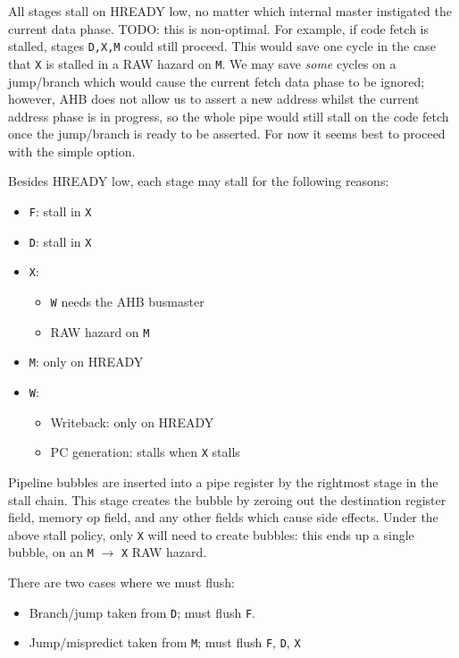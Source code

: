 \documentclass{article}
\begin{document}
All stages stall on HREADY low, no matter which internal master instigated the current data phase. TODO: this is non-optimal. For example, if code fetch is stalled, stages \texttt{D,X,M} could still proceed. This would save one cycle in the case that \texttt{X} is stalled in a RAW hazard on \texttt{M}. We may save \textit{some} cycles on a jump/branch which would cause the current fetch data phase to be ignored; however, AHB does not allow us to assert a new address whilst the current address phase is in progress, so the whole pipe would still stall on the code fetch once the jump/branch is ready to be asserted. For now it seems best to proceed with the simple option.

Besides HREADY low, each stage may stall for the following reasons:

\begin{itemize}
	\item \texttt{F}: stall in \texttt{X}
	\item \texttt{D}: stall in \texttt{X}
	\item \texttt{X}:
	\begin{itemize}
		\item \texttt{W} needs the AHB busmaster
		\item RAW hazard on \texttt{M}
	\end{itemize}
	\item \texttt{M}: only on HREADY
	\item \texttt{W}:
	\begin{itemize}
		\item Writeback: only on HREADY
		\item PC generation: stalls when \texttt{X} stalls
	\end{itemize}
\end{itemize}

Pipeline bubbles are inserted into a pipe register by the rightmost stage in the stall chain. This stage creates the bubble by zeroing out the destination register field, memory op field, and any other fields which cause side effects. Under the above stall policy, only \texttt{X} will need to create bubbles: this ends up a single bubble, on an \texttt{M} $\to$ \texttt{X} RAW hazard.

There are two cases where we must flush:

\begin{itemize}
	\item Branch/jump taken from \texttt{D}; must flush \texttt{F}.
	\item Jump/mispredict taken from \texttt{M}; must flush \texttt{F}, \texttt{D}, \texttt{X}
\end{itemize}
\end{document}
